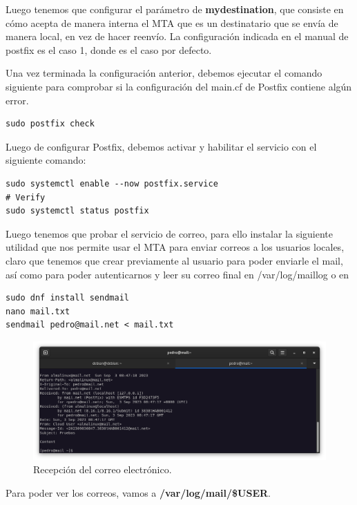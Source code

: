 Luego tenemos que configurar el parámetro de \textbf{mydestination}, que consiste en cómo acepta de manera interna el MTA que es un destinatario que se envía de manera local, en vez de hacer reenvío. La configuración indicada en el manual de postfix es el caso 1, donde es el caso por defecto.
\vspace{5mm}

Una vez terminada la configuración anterior, debemos ejecutar el comando siguiente para comprobar si la configuración del main.cf de Postfix contiene algún error.

\begin{lstlisting}[style=mybash]
sudo postfix check
\end{lstlisting}

Luego de configurar Postfix, debemos activar y habilitar el servicio con el siguiente comando:

\begin{lstlisting}[style=mybash]
sudo systemctl enable --now postfix.service
# Verify
sudo systemctl status postfix
\end{lstlisting}

Luego tenemos que probar el servicio de correo, para ello instalar la siguiente utilidad que nos permite usar el MTA para enviar correos a los usuarios locales, claro que tenemos que crear previamente al usuario para poder enviarle el mail, así como para poder autenticarnos y leer su correo final en /var/log/maillog o en 
\begin{lstlisting}[style=mybash]
sudo dnf install sendmail
nano mail.txt
sendmail pedro@mail.net < mail.txt
\end{lstlisting}

\begin{figure}[H]
	\centering
	\includegraphics[scale=0.30]{05}
	\caption{Recepción del correo electrónico.}
\end{figure}

Para poder ver los correos, vamos a \textbf{/var/log/mail/\$USER}. 

